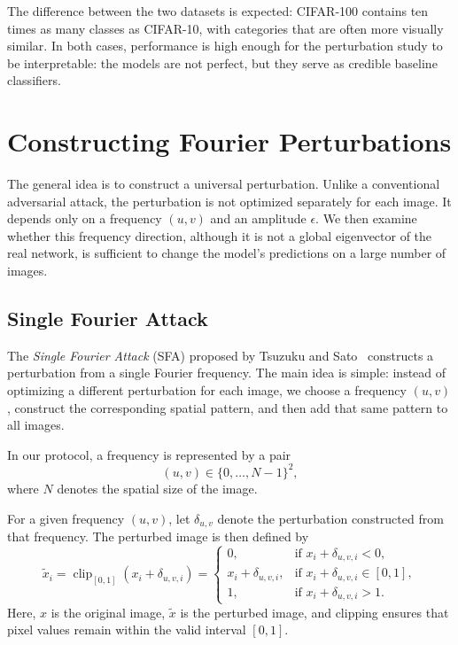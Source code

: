 The difference between the two datasets is expected: CIFAR-100 contains ten times as many classes as
CIFAR-10, with categories that are often more visually similar. In both cases, performance
is high enough for the perturbation study to be interpretable: the models are
not perfect, but they serve as credible baseline classifiers.

\section{Constructing Fourier Perturbations}
\label{sec:construction_perturbations_fourier}

The general idea is to construct a universal perturbation. Unlike a conventional adversarial attack,
the perturbation is not optimized separately for each image.
It depends only on a frequency $(u,v)$ and an amplitude $\epsilon$.
We then examine whether this frequency direction, although it is not a global eigenvector
of the real network, is sufficient to change the model's predictions on a large number of images.

\subsection{Single Fourier Attack}
\label{subsec:single_fourier_attack}

The \textit{Single Fourier Attack} (SFA) proposed by Tsuzuku and Sato~\cite{tsuzuku2019structural}
constructs a perturbation from a single Fourier frequency. The main idea
is simple: instead of optimizing a different perturbation for each image, we choose a
frequency $(u,v)$, construct the corresponding spatial pattern, and then add that same pattern to all
images.

In our protocol, a frequency is represented by a pair
\[
    (u,v) \in \{0,\dots,N-1\}^2,
\]
where $N$ denotes the spatial size of the image.

For a given frequency $(u,v)$, let $\delta_{u,v}$ denote the perturbation constructed from that
frequency. The perturbed image is then defined by
\begin{equation}
    \tilde{x}_{i}
    =
    \operatorname{clip}_{[0,1]}\left(x_i + \delta_{u,v,i}\right)
    =
    \begin{cases}
        0, & \text{if } x_i + \delta_{u,v,i} < 0, \\
        x_i + \delta_{u,v,i}, & \text{if } x_i + \delta_{u,v,i} \in [0,1], \\
        1, & \text{if } x_i + \delta_{u,v,i} > 1.
    \end{cases}
    \label{eq:single_fourier_attack}
\end{equation}
Here, $x$ is the original image, $\tilde{x}$ is the perturbed image, and clipping ensures that
pixel values remain within the valid interval $[0,1]$.

